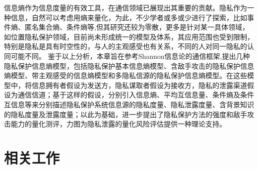信息熵作为信息度量的有效工具，在通信领域已展现出其重要的贡献。隐私作为一种信息，自然可以考虑用熵来量化，为此，不少学者或多或少进行了探索，比如事件熵、匿名集合熵、条件熵等\cite{serjantov2002towards,diaz2002towards,wagner2018technical},但其研究还较为零散，更多是针对某一具体领域，如位置隐私保护领域，目前尚未形成统一的模型及体系，其应用范围也受到限制，特别是隐私是具有时空性的，与人的主观感受也有关系，不同的人对同一隐私的认同可能不同。 鉴于以上分析，本章旨在参考Shannon信息论的通信框架\cite{stone2018information},提出几种隐私保护信息熵模型，包括隐私保护基本信息熵模型、含敌手攻击的隐私保护信息熵模型、带主观感受的信息熵模型和多隐私信源的隐私保护信息熵模型。在这些模型中，将信息拥有者假设为发送方，隐私谋取者假设为接收方，隐私的泄露渠道假设为通信信道；基于这样的假设，分别引入信息熵、平均互信息量、条件熵及条件互信息等来分别描述隐私保护系统信息源的隐私度量、隐私泄露度量、含背景知识的隐私度量及泄露度量；以此为基础，进一步提出了隐私保护方法的强度和敌手攻击能力的量化测评，力图为隐私泄露的量化风险评估提供一种理论支持。


\section{相关工作}\label{related work}

